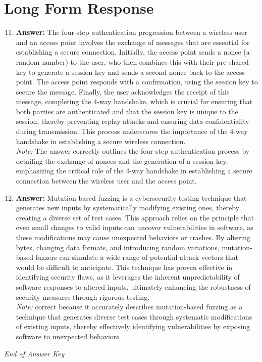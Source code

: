 \documentclass[12pt]{article}
\begin{document}
\section*{Long Form Response}
\begin{enumerate}[label=\arabic*.]
\setcounter{enumi}{10}
\item \textbf{Answer:} The four-step authentication progression between a wireless user and an access point involves the exchange of messages that are essential for establishing a secure connection. Initially, the access point sends a nonce (a random number) to the user, who then combines this with their pre-shared key to generate a session key and sends a second nonce back to the access point. The access point responds with a confirmation, using the session key to secure the message. Finally, the user acknowledges the receipt of this message, completing the 4-way handshake, which is crucial for ensuring that both parties are authenticated and that the session key is unique to the session, thereby preventing replay attacks and ensuring data confidentiality during transmission. This process underscores the importance of the 4-way handshake in establishing a secure wireless connection.
\\ \textit{Note:} The answer correctly outlines the four-step authentication process by detailing the exchange of nonces and the generation of a session key, emphasizing the critical role of the 4-way handshake in establishing a secure connection between the wireless user and the access point.
\item \textbf{Answer:} Mutation-based fuzzing is a cybersecurity testing technique that generates new inputs by systematically modifying existing ones, thereby creating a diverse set of test cases. This approach relies on the principle that even small changes to valid inputs can uncover vulnerabilities in software, as these modifications may cause unexpected behaviors or crashes. By altering bytes, changing data formats, and introducing random variations, mutation-based fuzzers can simulate a wide range of potential attack vectors that would be difficult to anticipate. This technique has proven effective in identifying security flaws, as it leverages the inherent unpredictability of software responses to altered inputs, ultimately enhancing the robustness of security measures through rigorous testing.
\\ \textit{Note:} correct because it accurately describes mutation-based fuzzing as a technique that generates diverse test cases through systematic modifications of existing inputs, thereby effectively identifying vulnerabilities by exposing software to unexpected behaviors.
\end{enumerate}

\vfill
\noindent\textit{End of Answer Key}
\end{document}
